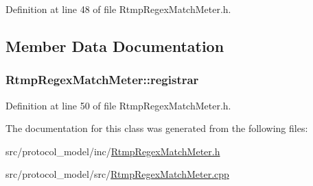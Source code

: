 Definition at line 48 of file Rtmp\-Regex\-Match\-Meter.\-h.



\subsection{Member Data Documentation}
\hypertarget{class_vsid_1_1_rtmp_regex_match_meter_ae1d6242aa5de0777da0be8a0df879ecd}{
\subsubsection[{registrar}]{ Rtmp\-Regex\-Match\-Meter\-::registrar\hspace{0.3cm}{\ttfamily [static]}}}\label{class_vsid_1_1_rtmp_regex_match_meter_ae1d6242aa5de0777da0be8a0df879ecd}


Definition at line 50 of file Rtmp\-Regex\-Match\-Meter.\-h.



The documentation for this class was generated from the following files\-:\begin{DoxyCompactItemize}
\item 
src/protocol\-\_\-model/inc/\hyperlink{_rtmp_regex_match_meter_8h}{Rtmp\-Regex\-Match\-Meter.\-h}\item 
src/protocol\-\_\-model/src/\hyperlink{_rtmp_regex_match_meter_8cpp}{Rtmp\-Regex\-Match\-Meter.\-cpp}\end{DoxyCompactItemize}

